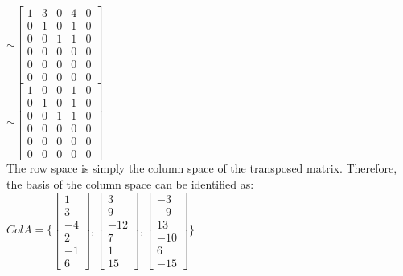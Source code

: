 \documentclass{report}
\begin{document}
\begin{center}
    $\sim \begin{bmatrix} 
        1 & 3 & 0 & 4 & 0 \\ 
        0 & 1 & 0 & 1 & 0 \\
        0 & 0 & 1 & 1 & 0 \\ 
        0 & 0 & 0 & 0 & 0 \\ 
        0 & 0 & 0 & 0 & 0 \\
        0 & 0 & 0 & 0 & 0
    \end{bmatrix}
    $\\\vspace{3mm}
    $\sim \begin{bmatrix} 
        1 & 0 & 0 & 1 & 0 \\ 
        0 & 1 & 0 & 1 & 0 \\
        0 & 0 & 1 & 1 & 0 \\ 
        0 & 0 & 0 & 0 & 0 \\ 
        0 & 0 & 0 & 0 & 0 \\
        0 & 0 & 0 & 0 & 0
    \end{bmatrix}
    $\\\vspace{3mm}
    The row space is simply the column space of the transposed matrix. Therefore, the basis of the column space can be identified as:\\
    $ColA=
    \{
        \begin{bmatrix}
            1 \\
            3 \\
            -4 \\
            2 \\
            -1 \\
            6
        \end{bmatrix}
        ,
        \begin{bmatrix}
            3 \\
            9 \\
            -12 \\
            7 \\
            1 \\
            15
        \end{bmatrix}
        ,
        \begin{bmatrix}
            -3 \\
            -9 \\
            13 \\
            -10 \\
            6 \\
            -15
        \end{bmatrix}
    \}
    $
\end{center}
\end{document}
